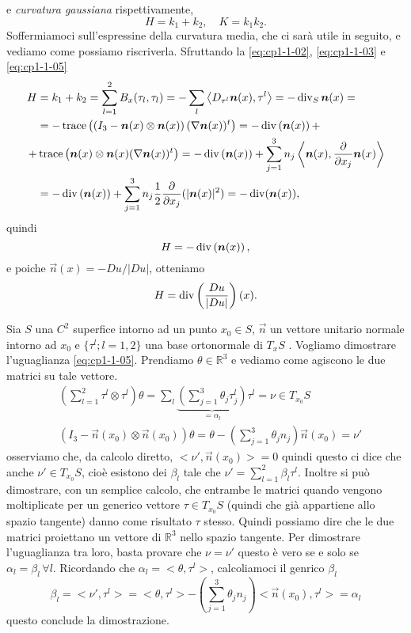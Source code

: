 e \emph{curvatura gaussiana} rispettivamente,
\begin{equation}
\label{eq:cp-1-1-06}
H=k_1+k_2,\quad K=k_1k_2.
\end{equation}
Soffermiamoci sull'espressine della curvatura media, che ci sarà utile in seguito, e vediamo come possiamo riscriverla. Sfruttando la \eqref{eq:cp1-1-02},  \eqref{eq:cp1-1-03} e \eqref{eq:cp1-1-05}
\[
\begin{aligned}
H &= k_1+k_2 = \sum_{l=1}^2B_x(\tau_l,\tau_l)=-\sum_{l}\left<D_{\tau^l}\bm{n}(x),\tau^l\right>=-\operatorname{div}_{S}\bm{n}(x)=\\
&=-\operatorname{trace}\left(\left(I_3 - \bm{n}(x)\otimes\bm{n}(x)\right) (\nabla \bm{n}(x))^t\right)=-\operatorname{div}\left(\bm{n}(x)\right)+\\
+&\operatorname{trace}\left(\bm{n}(x)\otimes\bm{n}(x) (\nabla \bm{n}(x))^t\right)=-\operatorname{div}\left(\bm{n}(x)\right)+ \sum_{j=1}^3n_j\left<\bm{n}(x),\frac{\partial}{\partial x_j}\bm{n}(x)\right>\\
&=-\operatorname{div}\left(\bm{n}(x)\right)+\sum_{j=1}^3n_j\frac{1}{2}\frac{\partial}{\partial x_j}(|\bm{n}(x)|^2)=-\operatorname{div}(\bm{n}(x)),
\end{aligned}
\]
quindi
\begin{equation}
\label{eq:cp1-1-07}
H=-\operatorname{div}\left(\bm{n}(x)\right),
\end{equation}
e poiche  $\vec{n}(x)=-Du/|Du|$, otteniamo
\[
H=\operatorname{div}\left(\frac{Du}{|Du|}\right)(x).
\]
\begin{osservazione}
\label{oss:cp1-1-01}
Sia $S$ una $C^2$ superfice intorno ad un punto $x_0\in S$,  $\vec{n}$
un vettore unitario normale intorno ad $x_0$ e $\{\tau^l;l=1,2\}$ una
base ortonormale di $T_xS$ . Vogliamo dimostrare l'uguaglianza \eqref{eq:cp1-1-05}. Prendiamo $\theta\in\mathbb{R}^3$ e vediamo come agiscono le due matrici su tale vettore.
\[
\begin{aligned}
&\left(\sum_{l=1}^2\tau^l\otimes\tau^l\right)\theta = \sum_l\underbrace{\left(\sum_{j=1}^3\theta_j\tau_j^l\right)}_{{}=\alpha_l}\tau^l=\nu \in T_{x_0}S\\
&\left(I_3-\vec{n}(x_0)\otimes\vec{n}(x_0)\right)\theta = \theta - \left(\sum_{j=1}^3\theta_jn_j\right)\vec{n}(x_0)=\nu' 
\end{aligned}
\]
osserviamo che, da calcolo diretto, $<\nu',\vec{n}(x_0)>=0$ quindi questo ci dice che anche $\nu'\in T_{x_0}S$, cioè esistono dei $\beta_l$ tale che $\nu'=\sum_{l=1}^2\beta_l\tau^l$. Inoltre si può dimostrare, con un semplice calcolo, che entrambe le matrici quando vengono moltiplicate per un generico vettore $\tau\in T_{x_0}S$ (quindi che già appartiene allo spazio tangente) danno come risultato $\tau$ stesso. Quindi possiamo dire che le due matrici proiettano un vettore di $\mathbb{R}^3$ nello spazio tangente. Per dimostrare l'uguaglianza tra loro, basta provare che $\nu=\nu'$ questo è vero se e solo se $\alpha_l=\beta_l\,\forall l$. Ricordando che $\alpha_l=<\theta,\tau^l>$, calcoliamoci il genrico $\beta_l$
\[
\beta_l=<\nu',\tau^l>=<\theta,\tau^l>-\left(\sum_{j=1}^3\theta_jn_j\right)<\vec{n}(x_0),\tau^l>=\alpha_l
\]
questo conclude la dimostrazione.
\end{osservazione}
%
%
